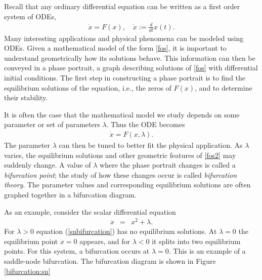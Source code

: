 \label{lab:Bifurcations}

Recall that any ordinary differential equation can be written as a first order system of ODEs,
\begin{align}
\dot{x} = F(x), \quad \dot{x} := \frac{d}{dt}x(t).\label{fos}
\end{align}
Many interesting applications and physical phenomena can be modeled using ODEs.
Given a mathematical model of the form \eqref{fos}, it is important to understand geometrically how its solutions behave.
This information can then be conveyed in a phase portrait, a graph describing solutions of \eqref{fos} with differential initial conditions.
The first step in constructing a phase portrait is to find the equilibrium solutions of the equation, i.e., the zeros of $F(x)$, and to determine their stability.

It is often the case that the mathematical model we study depends on some parameter or set of parameters $\lambda$.
Thus the ODE becomes
\begin{align}
\dot{x} = F(x,\lambda).\label{fos2}
\end{align}
The parameter $\lambda$ can then be tuned to better fit the physical application.
As $\lambda$ varies, the equilibrium solutions and other geometric features of \eqref{fos2} may suddenly change.
A value of $\lambda$ where the phase portrait changes is called a \emph{bifurcation point}; the study of how these changes occur is called \emph{bifurcation theory}.
The parameter values and corresponding equilibrium solutions are often graphed together in a bifurcation diagram.

As an example, consider the scalar differential equation
\begin{eqnarray}
\dot{x} &=& x^2 + \lambda. \label{snbifurcation}
\end{eqnarray}
For $\lambda > 0$ equation (\ref{snbifurcation}) has no equilibrium solutions.
At $\lambda = 0$ the equilibrium point $x=0$ appears, and for $\lambda < 0$ it splits into two equilibrium points.
For this system, a bifurcation occurs at $\lambda = 0$.
This is an example of a saddle-node bifurcation.
The bifurcation diagram is shown in Figure \ref{bifurcation:sn}

